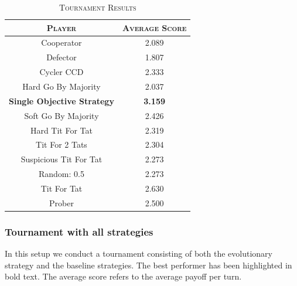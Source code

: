 \documentclass[a4paper]{article}
\begin{document}
	\begin{table}[H]
	  \begin{center}
	    \begin{tabular}{c|c}
	      \toprule
	      \textsc{Player} & \textsc{Average Score}\\
	      \midrule
			Cooperator & 2.089\\
			Defector & 1.807\\
			Cycler CCD & 2.333\\
			Hard Go By Majority & 2.037\\
			\textbf{Single Objective Strategy} & \textbf{3.159}\\
			Soft Go By Majority & 2.426\\
			Hard Tit For Tat & 2.319\\
			Tit For 2 Tats & 2.304\\
			Suspicious Tit For Tat & 2.273\\
			Random: 0.5 & 2.273\\
			Tit For Tat & 2.630\\
			Prober & 2.500\\
		  \bottomrule
	    \end{tabular}
	    \caption{\textsc{Tournament Results}}
	  \end{center}
	\end{table}  

	\subsubsection{Tournament with all strategies}
	
In this setup we conduct a tournament consisting of both the evolutionary strategy and the baseline strategies. The best performer has been highlighted in bold text. The average score refers to the average payoff per turn.	
	
\end{document}
